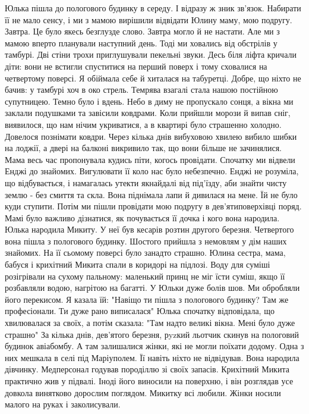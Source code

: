 Юлька пішла до пологового будинку в середу. 
І відразу ж зник зв'язок. 
Набирати її не мало сенсу, і ми з мамою вирішили відвідати Юлину маму, мою подругу. 
Завтра. 
Це було якесь безглузде слово.
Завтра могло й не настати. Але ми з мамою вперто планували наступний день.
Тоді ми ховались від обстрілів у тамбурі.  
Дві стіни трохи приглушували пекельні звуки. 
Десь біля ліфта кричали діти: вони не встигли спуститися на перший поверх і тому сховалися на четвертому поверсі. 
Я обіймала себе й хиталася на табуретці. 
Добре, що ніхто не бачив: у тамбурі хоч в око стрель. 
Темрява взагалі стала нашою постійною супутницею.
Темно було і вдень. 
Небо в  диму не пропускало сонця, а вікна ми заклали подушками та завісили ковдрами. 
Коли прийшли морози й випав сніг, виявилося, що нам нічим укриватися, а в квартирі було страшенно холодно. 
Довелося познімати ковдри.
Через кілька днів вибуховою хвилею вибило шибки на лоджії, а двері на балконі викривило так, що вони більше не зачинялися.
Мама весь час пропонувала кудись піти, когось провідати. 
Спочатку ми відвели  Енджі до знайомих.
Вигулювати її коло нас було небезпечно. 
Енджі не розуміла, що відбувається, і намагалась утекти якнайдалі від під'їзду, аби знайти чисту землю -  без смиття  та скла.
Вона піднімала лапи й дивилася на мене. Їй не було куди ступити.
Потім ми пішли провідати мою подругу в дев'ятиповерхівці поряд. 
Мамі було важливо дізнатися, як почувається її дочка і кого вона народила.
Юлька народила Микиту. 
У неї був кесарів розтин другого березня.
Четвертого вона пішла з пологового будинку. 
Шостого прийшла з немовлям у дім наших знайомих.
На її сьомому поверсі було занадто страшно.
Юлина сестра, мама, бабуся і крихітний Микита спали в коридорі на підлозі. 
Воду для суміші розігрівали на сухому пальному: маленький принц не міг їсти суміш, якщо її розбавляли водою, нагрітою на багатті.
У Юльки дуже болів шов. 
Ми обробляли його перекисом. Я казала їй: 
"Навіщо ти пішла з пологового будинку? Там же професіонали. Ти дуже рано виписалася"
Юлька спочатку відповідала, що хвилювалася за своїх, а потім сказала:
"Там надто великі вікна. Мені було дуже страшно"
За кілька днів, дев'ятого березня, рyzкий льотчик скинув на пологовий будинок авіабомбу. 
А там залишалися жінки, які не могли поїхати додому. 
Одна з них мешкала в селі під Маріуполем. 
Її навіть ніхто не відвідував. Вона народила дівчинку.
Медперсонал годував породіллю зі своїх запасів.
Крихітний Микита практично жив у підвалі. 
Іноді його виносили на поверхню, і він розглядав усе довкола винятково дорослим поглядом.
Микитку всі  любили. 
Жінки носили малого на руках і заколисували. 
